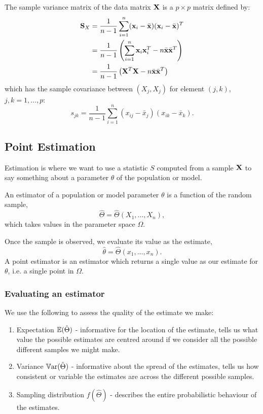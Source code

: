 \documentclass[10pt, a4paper]{article}
\begin{document}
\begin{definition}
    The sample variance matrix of the data matrix $\mathbf{X}$ is a $p \times p$ matrix defined by:
    \begin{align*}
        \mathbf{S}_{X} &= \frac{1}{n - 1}\sum_{i = 1}^{n}(\mathbf{x}_i - \bar{\mathbf{x}})(\mathbf{x}_i - \bar{\mathbf{x}}) ^ T \\
        &= \frac{1}{n - 1}\left(\sum_{i = 1}^{n}\mathbf{x}_i\mathbf{x}_i ^ T - n\bar{\mathbf{x}}\bar{\mathbf{x}} ^ T\right) \\
        &= \frac{1}{n - 1}\left(\mathbf{X} ^ T\mathbf{X} - n\bar{\mathbf{x}}\bar{\mathbf{x}} ^ T\right)
    \end{align*}
    which has the sample covariance between $(X_j, X_j)$ for element $(j, k)$,
    $j, k = 1, \dotsc, p$:
    \[
    s_{jk} = \frac{1}{n - 1}\sum_{i = 1}^{n}(x_{ij} - \bar{x}_j)(x_{ik} - \bar{x}_k).
    \]
\end{definition}

\subsection{Point Estimation}

Estimation is where we want to use a statistic $S$ computed from a sample $\mathbf{X}$ to say something about a parameter $\theta$ of the population or model.

\begin{definition}
    An estimator of a population or model parameter $\theta$ is a function of the random sample,
    \[
    \hat{\Theta} = \hat{\Theta}(X_1, \dotsc, X_n),
    \]
    which takes values in the parameter space $\Omega$.

    Once the sample is observed,
    we evaluate its value as the estimate,
    \[
    \hat{\theta} = \hat{\Theta}(x_1, \dotsc, x_n).
    \]
    A point estimator is an estimator which returns a single value as our estimate for $\theta$,
    i.e. a single point in $\Omega$.
\end{definition}

\subsubsection{Evaluating an estimator}

We use the following to assess the quality of the estimate we make:
\begin{enumerate}[label = (\roman*)]
    \item Expectation $\mathbb{E}(\hat{\Theta})$ -
    informative for the location of the estimate,
    tells us what value the possible estimates are centred around if we consider all the possible different samples we might make.

    \item Variance $\mathbb{V}\mathrm{ar}(\hat{\Theta})$ -
    informative about the spread of the estimates,
    tells us how consistent or variable the estimates are across the different possible samples.

    \item Sampling distribution $f(\hat{\Theta})$ -
    describes the entire probabilistic behaviour of the estimates.
\end{enumerate}
\end{document}
